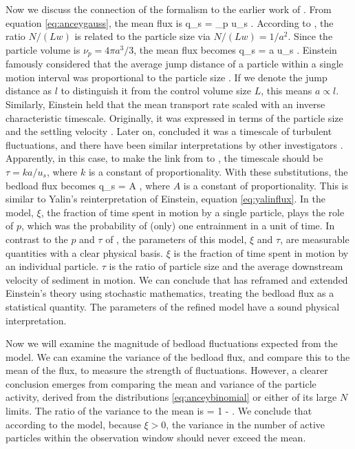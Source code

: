 Now we discuss the connection of the \citet{Ancey2006} formalism to the earlier work of \citet{Einstein1950}. 
From equation \ref{eq:anceygauss}, the mean flux is 
\be \bra q_s \ket = \nu_p u_s \xi {}.\ee
According to \citet{Einstein1950}, the ratio $N/(Lw)$ is related to the particle size via $N/(Lw) = 1/ a^2$. Since the particle volume is $\nu_p = 4\pi a^3/3$, the mean flux becomes 
\be \bra q_s \ket = \pi a u_s \xi. \ee
Einstein famously considered that the average jump distance of a particle within a single motion interval was proportional to the particle size \citep{Einstein1950, Yalin1972}. 
If we denote the jump distance as $l$ to distinguish it from the control volume size $L$, this means $a \propto l$.
Similarly, Einstein held that the mean transport rate scaled with an inverse characteristic timescale.  
Originally, it was expressed in terms of the particle size and the settling velocity \citep{Einstein1950}. 
Later on, \citet{Yalin1972} concluded it was a timescale of turbulent fluctuations, and there have been similar interpretations by other investigators \citep{Paintal1971, Cheng2004, Armanini2015}. 
Apparently, in this case, to make the link from \citet{Ancey2006} to \citet{Einstein1950}, the timescale should be 
$\tau = k a/u_s$, where $k$ is a constant of proportionality.  
With these substitutions, the bedload flux becomes 
\be \bra q_s \ket = A  \xi ,\ee
where $A$ is a constant of proportionality. 
This is similar to Yalin's reinterpretation of Einstein, equation \ref{eq:yalinflux}. 
In the \citet{Ancey2006} model, $\xi$, the fraction of time spent in motion by a single particle, plays the role of $p$, which was the probability of (only) one entrainment in a unit of time.  
In contrast to the $p$ and $\tau$ of \citet{Einstein1950}, the parameters of this model, $\xi$ and $\tau$, are measurable quantities with a clear physical basis. $\xi$ is the fraction of time spent in motion by an individual particle. $\tau$ is the ratio of particle size and the average downstream velocity of sediment in motion.  
We can conclude that \citet{Ancey2006} has reframed and extended Einstein's theory using stochastic mathematics, treating the bedload flux as a statistical quantity. 
The parameters of the refined model have a sound physical interpretation. 

Now we will examine the magnitude of bedload fluctuations expected from the model. 
We can examine the variance of the bedload flux, and compare this to the mean of the flux, to measure the strength of fluctuations. 
However, a clearer conclusion emerges from comparing the mean and variance of the particle activity, derived from the distributions \ref{eq:anceybinomial} or either of its large $N$ limits. 
The ratio of the variance to the mean is 
\be {} = 1 - \xi. \label{eq:2006flucts} \ee
We conclude that according to the \citet{Ancey2006} model, because $\xi>0$, the variance in the number of active particles within the observation window should never exceed the mean.   

